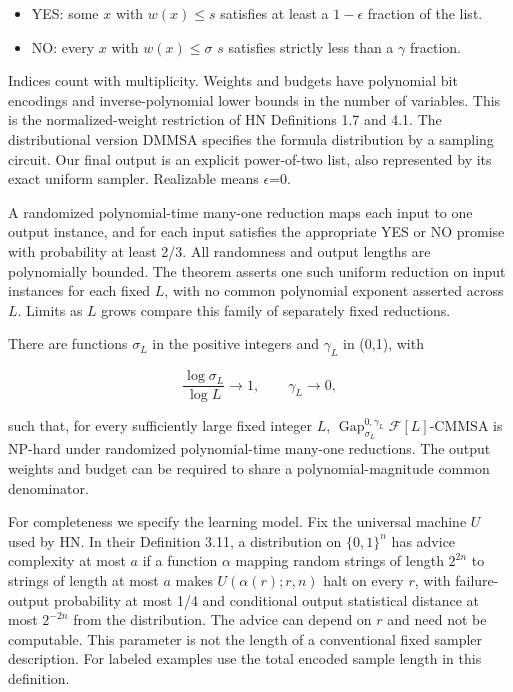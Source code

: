\begin{itemize}
\item YES: some \(x\) with \(w(x)\)\(\le\)\(s\) satisfies at least a \(1-\epsilon\) fraction of the list.
\item NO: every \(x\) with \(w(x)\)\(\le\)\(\sigma\) \(s\) satisfies strictly less than a \(\gamma\) fraction.
\end{itemize}

Indices count with multiplicity. Weights and budgets have polynomial bit encodings and inverse-polynomial lower bounds in the number of variables. This is the normalized-weight restriction of HN Definitions 1.7 and 4.1. The distributional version DMMSA specifies the formula distribution by a sampling circuit. Our final output is an explicit power-of-two list, also represented by its exact uniform sampler. Realizable means \(\epsilon\)=0.

A randomized polynomial-time many-one reduction maps each input to one output instance, and for each input satisfies the appropriate YES or NO promise with probability at least 2/3. All randomness and output lengths are polynomially bounded. The theorem asserts one such uniform reduction on input instances for each fixed \(L\), with no common polynomial exponent asserted across \(L\). Limits as \(L\) grows compare this family of separately fixed reductions.

\begin{theorem}\label{thm:main}There are functions \(\sigma_L\) in the positive integers and \(\gamma_L\) in (0,1), with

\begin{equation}\label{eq:1}
\frac{\log\sigma_L}{\log L}\longrightarrow1,\qquad\gamma_L\longrightarrow0,
\end{equation}

such that, for every sufficiently large fixed integer \(L\), \(\operatorname{Gap}^{0,\gamma_L}_{\sigma_L}\mathcal F[L]\text{-CMMSA}\) is NP-hard under randomized polynomial-time many-one reductions. The output weights and budget can be required to share a polynomial-magnitude common denominator.
\end{theorem}

For completeness we specify the learning model. Fix the universal machine \(U\) used by HN. In their Definition 3.11, a distribution on \(\{0,1\}^n\) has advice complexity at most \(a\) if a function \(\alpha\) mapping random strings of length \(2^{2n}\) to strings of length at most \(a\) makes \(U(\alpha(r);r,n)\) halt on every \(r\), with failure-output probability at most 1/4 and conditional output statistical distance at most \(2^{-2n}\) from the distribution. The advice can depend on \(r\) and need not be computable. This parameter is not the length of a conventional fixed sampler description. For labeled examples use the total encoded sample length in this definition.

